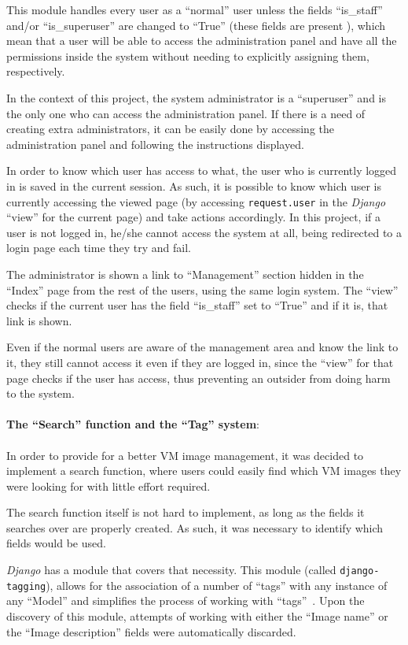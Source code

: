 This module handles every user as a ``normal'' user unless the fields ``is\_staff'' and/or ``is\_superuser'' are changed to ``True'' (these fields are present ), which mean that a user will be able to access the administration panel and have all the permissions inside the system without needing to explicitly assigning them, respectively.

In the context of this project, the system administrator is a ``superuser'' and is the only one who can access the administration panel. If there is a need of creating extra administrators, it can be easily done by accessing the administration panel and following the instructions displayed.

In order to know which user has access to what, the user who is currently logged in is saved in the current session. As such, it is possible to know which user is currently accessing the viewed page (by accessing \texttt{request.user} in the \textit{Django} ``view'' for the current page) and take actions accordingly. In this project, if a user is not logged in, he/she cannot access the system at all, being redirected to a login page each time they try and fail. 

The administrator is shown a link to ``Management'' section hidden in the ``Index'' page from the rest of the users, using the same login system. The ``view'' checks if the current user has the field ``is\_staff'' set to ``True'' and if it is, that link is shown.

Even if the normal users are aware of the management area and know the link to it, they still cannot access it even if they are logged in, since the ``view'' for that page checks if the user has access, thus preventing an outsider from doing harm to the system.\\
\ \\
\textbf{The ``Search'' function and the ``Tag'' system}:\\
\ \\
In order to provide for a better VM image management, it was decided to implement a search function, where users could easily find which VM images they were looking for with little effort required. 

The search function itself is not hard to implement, as long as the fields it searches over are properly created. As such, it was necessary to identify which fields would be used.

\textit{Django} has a module that covers that necessity. This module (called \texttt{django-tagging}), allows for the association of a number of ``tags'' with any instance of any ``Model'' and simplifies the process of working with ``tags''~\cite{django-tagging}. Upon the discovery of this module, attempts of working with either the ``Image name'' or the ``Image description'' fields were automatically discarded.

